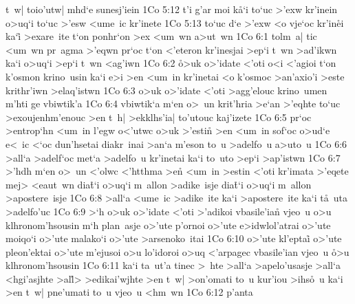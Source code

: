 t~w|
toio'utw|
mhd`e
sunesj'iein\bibvsend
\vs 1Co 5:12
t'i
g'ar
moi
k\r{a}`i
to`uc
>'exw
kr'inein
o>uq`i
to`uc
>'esw
<ume~ic
kr'inete\bibvsend
\vs 1Co 5:13
to`uc
d`e
>'exw
<o
vje`oc
kr'in\r{e}i
ka`i\r{}
>exare~ite
t`on
ponhr`on
>ex
<um~wn
a>ut~wn\bibvsend
\vs 1Co 6:1
tolm~a|
tic
<um~wn
pr~agma
>'eqwn
pr`oc
t`on
<'eteron
kr'inesjai
>ep`i
t~wn
>ad'ikwn
ka`i
o>uq`i
>ep`i
t~wn
<ag'iwn\bibvsend
\vs 1Co 6:2
\r{o}>uk
o>'idate
<'oti
o<i
<'agioi
t`on
k'osmon
krino~usin
ka`i
e>i
>en
<um~in
kr'inetai
<o
k'osmoc
>an'axio'i
>este
krithr'iwn
>elaq'istwn\bibvsend
\vs 1Co 6:3
o>uk
o>'idate
<'oti
>agg'elouc
krino~umen
m'hti
ge
vbiwtik'a\bibvsend
\vs 1Co 6:4
vbiwtik`a
m`en
o>~un
krit'hria
>e`an
>'eqhte
to`uc
>exoujenhm'enouc
>en
t~h|
>ekklhs'ia|
to'utouc
kaj'izete\bibvsend
\vs 1Co 6:5
pr`oc
>entrop`hn
<um~in
l'egw
o<'utwc
o>uk
>'estin\r{}
>en
<um~in
sof`oc
o>ud`e
e<~ic
<`oc
dun'hsetai
diakr~inai
>an`a
m'eson
to~u
>adelfo~u
a>uto~u\bibvsend
\vs 1Co 6:6
>all`a
>adelf`oc
met`a
>adelfo~u
kr'inetai
ka`i
to~uto
>ep`i
>ap'istwn\bibvsend
\vs 1Co 6:7
>'hdh
m`en
o>~un
<'olwc
<'htthma
>e\r{n}
<um~in
>estin
<'oti
kr'imata
>'eqete
mej>
<eaut~wn
dia\r{t}`i
o>uq`i
m~allon
>adike~isje
dia\r{t}`i
o>uq`i
m~allon
>apostere~isje\bibvsend
\vs 1Co 6:8
>all`a
<ume~ic
>adike~ite
ka`i
>apostere~ite
ka`i
t\r{a}~uta
>adelfo'uc\bibvsend
\vs 1Co 6:9
>`h
o>uk
o>'idate
<'oti
>'adikoi
vbasile'ian\r{}
vjeo~u
o>u
klhronom'hsousin
m`h
plan~asje
o>'ute
p'ornoi
o>'ute
e>idwlol'atrai
o>'ute
moiqo`i
o>'ute
malako`i
o>'ute
>arsenoko~itai\bibvsend
\vs 1Co 6:10
o>'ute
kl'eptai\r{}
o>'ute
pleon'ektai
o>'ute
m'ejusoi
o>u
lo'idoroi
o>uq
<'arpagec
vbasile'ian
vjeo~u
\r{o}>u
klhronom'hsousin\bibvsend
\vs 1Co 6:11
ka`i
ta~ut'a
tinec
>~hte
>all`a
>apelo'usasje
>all`a
<hgi'asjhte
>al\r{l}>
>edikai'wjhte
>en
t~w|
>on'omati
to~u
kur'iou
>ihs\r{o}~u
ka`i
>en
t~w|
pne'umati
to~u
vjeo~u
<hm~wn\bibvsend
\vs 1Co 6:12
p'anta
